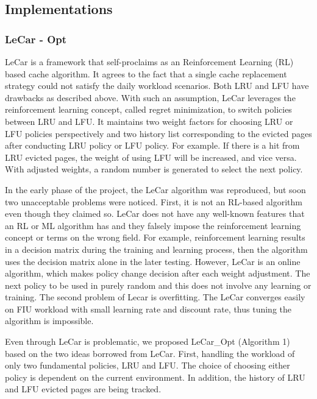 \documentclass[letterpaper,twocolumn,10pt]{article}
\begin{document}
\subsection{Implementations}

\subsubsection{LeCar - Opt}

LeCar\cite{vietri2018driving} is a framework that self-proclaims as an Reinforcement Learning (RL) based cache algorithm. It agrees to the fact that a single cache replacement strategy could not satisfy the daily workload scenarios. Both LRU and LFU have drawbacks as described above. With such an assumption, LeCar leverages the reinforcement learning concept, called regret minimization, to switch policies between LRU and LFU. It maintains two weight factors for choosing LRU or LFU policies perspectively and two history list corresponding to the evicted pages after conducting LRU policy or LFU policy. For example. If there is a hit from LRU evicted pages, the weight of using LFU will be increased, and vice versa. With adjusted weights, a random number is generated to select the next policy. 

In the early phase of the project, the LeCar algorithm was reproduced, but soon two unacceptable problems were noticed. First, it is not an RL-based algorithm even though they claimed so. LeCar does not have any well-known features that an RL or ML algorithm has and they falsely impose the reinforcement learning concept or terms on the wrong field. For example, reinforcement learning results in a decision matrix during the training and learning process, then the algorithm uses the decision matrix alone in the later testing. However, LeCar is an online algorithm, which makes policy change decision after each weight adjustment. The next policy to be used in purely random and this does not involve any learning or training. The second problem of Lecar is overfitting. The LeCar converges easily on FIU workload with small learning rate and discount rate, thus tuning the algorithm is impossible. 

Even through LeCar is problematic, we proposed LeCar\_Opt (Algorithm 1) based on the two ideas borrowed from LeCar. First, handling the workload of only two fundamental policies, LRU and LFU. The choice of choosing either policy is dependent on the current environment. In addition, the history of LRU and LFU evicted pages are being tracked. 
\end{document}
